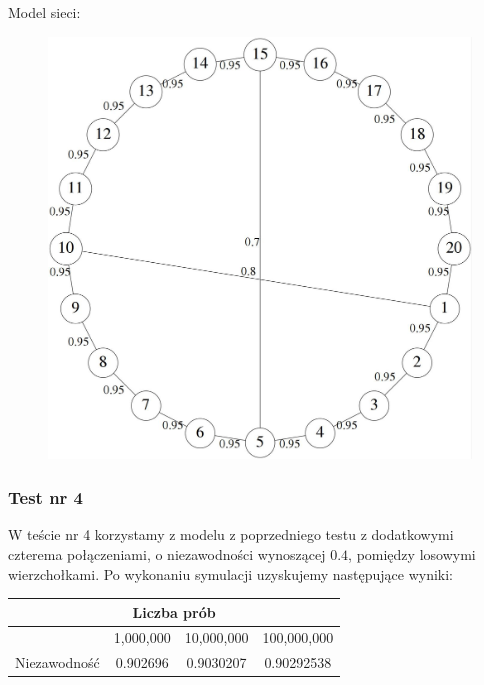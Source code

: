 \documentclass[titlepage]{article}
\begin{document}
\noindent Model sieci:
\begin{figure}[h!]
	\centering
	\includegraphics[width=0.8\linewidth]{graph3.jpg}
\end{figure}

\newpage
\subsubsection{Test nr 4}
W teście nr 4 korzystamy z modelu z poprzedniego testu z dodatkowymi czterema połączeniami, o niezawodności wynoszącej $0.4$, pomiędzy losowymi wierzchołkami. Po wykonaniu symulacji uzyskujemy następujące wyniki:
\begin{table}[h!]
	\centering
    \label{tab:table4}
    \begin{tabular}{|c|c|c|c|}
    		\multicolumn{4}{c}{Liczba prób}\\
    		\hline
      	& 1,000,000 & 10,000,000 & 100,000,000\\
      	\hline
      	Niezawodność & 0.902696 & 0.9030207 & 0.90292538\\
		\hline
    \end{tabular}
\end{table}
\end{document}
